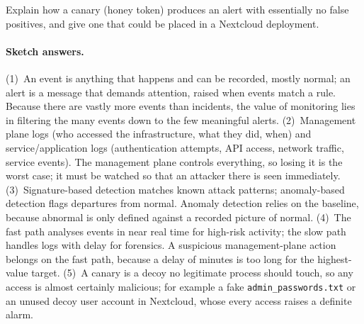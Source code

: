 \begin{exercise}
Explain how a canary (honey token) produces an alert with essentially no
false positives, and give one that could be placed in a Nextcloud deployment.
\end{exercise}

\paragraph{Sketch answers.}
{\small
(1)~An event is anything that happens and can be recorded, mostly normal; an
alert is a message that demands attention, raised when events match a rule.
Because there are vastly more events than incidents, the value of monitoring
lies in filtering the many events down to the few meaningful alerts.
(2)~Management plane logs (who accessed the infrastructure, what they did,
when) and service/application logs (authentication attempts, API access,
network traffic, service events). The management plane controls everything,
so losing it is the worst case; it must be watched so that an attacker there
is seen immediately. (3)~Signature-based detection matches known attack
patterns; anomaly-based detection flags departures from normal. Anomaly
detection relies on the baseline, because abnormal is only defined against a
recorded picture of normal. (4)~The fast path analyses events in near real
time for high-risk activity; the slow path handles logs with delay for
forensics. A suspicious management-plane action belongs on the fast path,
because a delay of minutes is too long for the highest-value target. (5)~A
canary is a decoy no legitimate process should touch, so any access is almost
certainly malicious; for example a fake \texttt{admin\_passwords.txt} or an
unused decoy user account in Nextcloud, whose every access raises a definite
alarm.}


